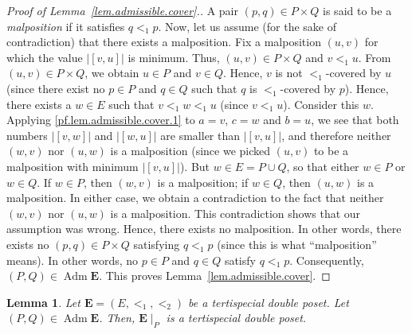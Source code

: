 \documentclass[12pt]{article}
\theoremstyle{plain}
\newtheorem{lemma}[theorem]{Lemma}
\theoremstyle{definition}
\theoremstyle{remark}
\newcommand{\Adm}{\operatorname{Adm}}
\newcommand{\EE}{{\mathbf{E}}}
\begin{document}
\begin{proof}[Proof of Lemma~\ref{lem.admissible.cover}.]
A pair $\left(p, q\right) \in P \times Q$ is said to be a
\textit{malposition} if it satisfies $q <_1 p$. Now, let us
assume (for the sake of contradiction) that there exists a
malposition. Fix a malposition $\left(u, v\right)$ for which the
value $\left|\left[v, u\right]\right|$ is minimum. Thus,
$\left(u, v\right) \in P \times Q$ and $v <_1 u$.
From $\left(u, v\right) \in P \times Q$, we obtain
$u \in P$ and $v \in Q$. Hence, $v$ is not
$<_1$-covered by $u$ (since there exist no $p \in P$ and $q \in Q$
such that $q$ is $<_1$-covered by $p$). Hence, there exists a
$w \in E$ such that $v <_1 w <_1 u$ (since $v <_1 u$). Consider
this $w$. Applying \eqref{pf.lem.admissible.cover.1} to $a = v$,
$c = w$ and $b = u$, we see that both numbers
$\left|\left[v, w\right]\right|$ and
$\left|\left[w, u\right]\right|$ are smaller than
$\left|\left[v, u\right]\right|$, and therefore neither
$\left(w, v\right)$ nor $\left(u, w\right)$ is a malposition
(since we picked $\left(u, v\right)$ to be a malposition with
minimum $\left|\left[v, u\right]\right|$). But
$w \in E = P \cup Q$, so that either $w \in P$ or $w \in Q$.
If $w \in P$, then $\left(w, v\right)$ is a malposition;
if $w \in Q$, then $\left(u, w\right)$ is a malposition. In
either case, we obtain a contradiction to the fact that
neither $\left(w, v\right)$ nor $\left(u, w\right)$ is a malposition.
This contradiction shows that our assumption was wrong.
Hence, there exists no malposition. In other words, there
exists no $\left(p, q\right) \in P \times Q$ satisfying
$q <_1 p$ (since this is what ``malposition'' means). In
other words, no $p \in P$ and $q \in Q$ satisfy $q <_1 p$.
Consequently, $\left(P, Q\right) \in \Adm \EE$.
This proves Lemma~\ref{lem.admissible.cover}.
\end{proof}

\begin{lemma}
\label{lem.tertispecial.subset}
Let $\EE = \left(E, <_1, <_2\right)$ be a tertispecial
double poset.
Let $\left(P,Q\right) \in \Adm \EE$. Then, $\EE\mid_P$ is
a tertispecial double poset.
\end{lemma}
\end{document}

